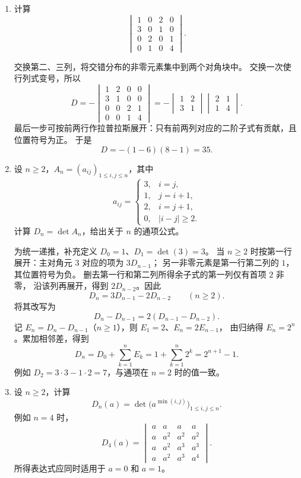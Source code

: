 \documentclass[UTF8,12pt,a4paper,fontset=fandol]{ctexart}
\begin{document}
\begin{enumerate}[label=\arabic*.]
\item\label{q:detcalc-sparse}
计算
\[
\begin{vmatrix}
1&0&2&0\\
3&0&1&0\\
0&2&0&1\\
0&1&0&4
\end{vmatrix}.
\]

\begin{solve}
交换第二、三列，将交错分布的非零元素集中到两个对角块中。
交换一次使行列式变号，所以
\[
D=-\begin{vmatrix}
1&2&0&0\\
3&1&0&0\\
0&0&2&1\\
0&0&1&4
\end{vmatrix}
=-\begin{vmatrix}1&2\\3&1\end{vmatrix}
\begin{vmatrix}2&1\\1&4\end{vmatrix}.
\]
最后一步可按前两行作拉普拉斯展开：只有前两列对应的二阶子式有贡献，且位置符号为正。
于是
\[
D=-(1-6)(8-1)=\boxed{35}.
\]
\end{solve}

\item\label{q:detcalc-tridiagonal}
设 $n\geq2$，$A_n=(a_{ij})_{1\leq i,j\leq n}$，其中
\[
a_{ij}=\begin{cases}
3,&i=j,\\
1,&j=i+1,\\
2,&i=j+1,\\
0,&|i-j|\geq2.
\end{cases}
\]
计算 $D_n=\det A_n$，给出关于 $n$ 的通项公式。

\begin{solve}
为统一递推，补充定义 $D_0=1$、$D_1=\det(3)=3$。
当 $n\geq2$ 时按第一行展开：主对角元 $3$ 对应的项为 $3D_{n-1}$；
另一非零元素是第一行第二列的 $1$，其位置符号为负。
删去第一行和第二列所得余子式的第一列仅有首项 $2$ 非零，
沿该列再展开，得到 $2D_{n-2}$。因此
\[
D_n=3D_{n-1}-2D_{n-2}\qquad(n\geq2).
\]
将其改写为
\[
D_n-D_{n-1}=2(D_{n-1}-D_{n-2}).
\]
记 $E_n=D_n-D_{n-1}$（$n\geq1$），则 $E_1=2$、$E_n=2E_{n-1}$，
由归纳得 $E_n=2^n$。累加相邻差，得到
\[
D_n=D_0+\sum_{k=1}^n E_k
=1+\sum_{k=1}^n2^k=\boxed{2^{n+1}-1}.
\]
例如 $D_2=3\cdot3-1\cdot2=7$，与通项在 $n=2$ 时的值一致。
\end{solve}

\item\label{q:detcalc-min-powers}
设 $n\geq2$，计算
\[
D_n(a)=\det\bigl(a^{\min(i,j)}\bigr)_{1\leq i,j\leq n}.
\]
例如 $n=4$ 时，
\[
D_4(a)=\begin{vmatrix}
a&a&a&a\\
a&a^2&a^2&a^2\\
a&a^2&a^3&a^3\\
a&a^2&a^3&a^4
\end{vmatrix}.
\]
所得表达式应同时适用于 $a=0$ 和 $a=1$。


\end{enumerate}
\end{document}

